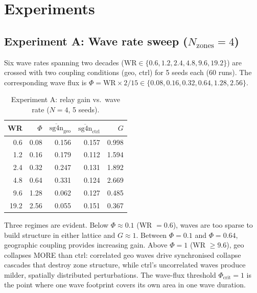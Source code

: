 \documentclass[11pt]{article}
\begin{document}
\section{Experiments}

\subsection*{Experiment A: Wave rate sweep ($N_{\mathrm{zones}} = 4$)}

Six wave rates spanning two decades ($\mathrm{WR} \in \{0.6, 1.2, 2.4, 4.8, 9.6, 19.2\}$)
are crossed with two coupling conditions (geo, ctrl) for 5 seeds each (60 runs).
The corresponding wave flux is $\Phi = \mathrm{WR} \times 2 / 15 \in \{0.08, 0.16, 0.32, 0.64, 1.28, 2.56\}$.

\begin{table}[h]
\centering
\caption{Experiment A: relay gain vs.\ wave rate ($N=4$, 5 seeds).}
\label{tab:exp_a}
\begin{tabular}{rrrrr}
\toprule
WR & $\Phi$ & $\overline{\mathrm{sg4n}}_{\mathrm{geo}}$ & $\overline{\mathrm{sg4n}}_{\mathrm{ctrl}}$ & $G$ \\
\midrule
0.6  & 0.08 & 0.156 & 0.157 & 0.998 \\
1.2  & 0.16 & 0.179 & 0.112 & 1.594 \\
2.4  & 0.32 & 0.247 & 0.131 & 1.892 \\
4.8  & 0.64 & 0.331 & 0.124 & 2.669 \\
9.6  & 1.28 & 0.062 & 0.127 & 0.485 \\
19.2 & 2.56 & 0.055 & 0.151 & 0.367 \\
\bottomrule
\end{tabular}
\end{table}

Three regimes are evident. Below $\Phi \approx 0.1$ (WR $= 0.6$), waves are too sparse to
build structure in either lattice and $G \approx 1$. Between $\Phi = 0.1$ and $\Phi = 0.64$,
geographic coupling provides increasing gain. Above $\Phi = 1$ (WR $\geq 9.6$), geo
collapses MORE than ctrl: correlated geo waves drive synchronised collapse cascades that
destroy zone structure, while ctrl's uncorrelated waves produce milder, spatially
distributed perturbations. The wave-flux threshold $\Phi_{\mathrm{crit}} = 1$ is the
point where one wave footprint covers its own area in one wave duration.
\end{document}
